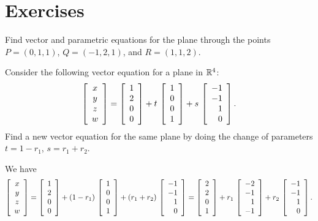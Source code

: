 \documentclass{ximera}
\author{Zack Reed}
\begin{document}
\section*{Exercises}

\begin{exercise}
  Find vector and parametric equations for the plane through the
  points $P = (0,1,1)$, $Q = (-1,2,1)$, and $R = (1,1,2)$.
\end{exercise}

\begin{exercise}
  Consider the following vector equation for a plane in $\R^4$:
  \begin{equation*}
    \startmat{c} x\\y\\z\\w \stopmat
    = \startmat{r} 1\\2\\0\\0 \stopmat
    + t\,\startmat{r} 1\\0\\0\\1 \stopmat
    + s\,\startmat{r} -1\\-1\\1\\0 \stopmat.
  \end{equation*}
  Find a new vector equation for the same plane by doing the change of
  parameters%
  $t=1-r_1$, $s=r_1+r_2$.
  \begin{solution}
    We have
    \begin{equation*}
      \startmat{c} x\\y\\z\\w \stopmat
      = \startmat{r} 1\\2\\0\\0 \stopmat
      + (1-r_1)\,\startmat{r} 1\\0\\0\\1 \stopmat
      + (r_1+r_2)\,\startmat{r} -1\\-1\\1\\0 \stopmat
      = \startmat{r} 2\\2\\0\\1 \stopmat
      + r_1\,\startmat{r} -2\\-1\\1\\-1 \stopmat
      + r_2\,\startmat{r} -1\\-1\\1\\0 \stopmat.
    \end{equation*}
  \end{solution}
\end{exercise}
\end{document}
